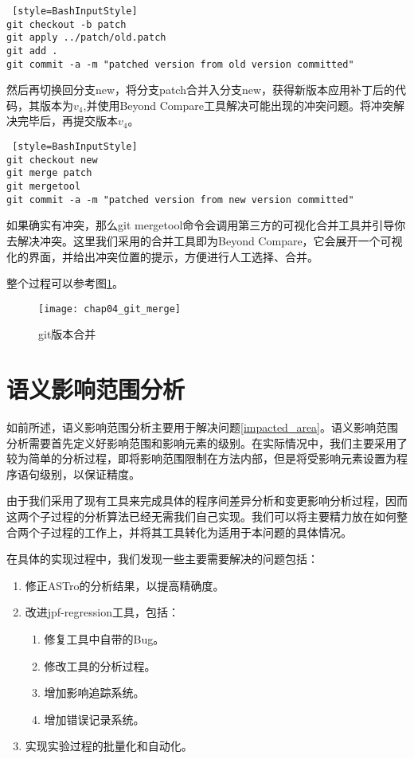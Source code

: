 \begin{lstlisting} [style=BashInputStyle]
git checkout -b patch
git apply ../patch/old.patch
git add .
git commit -a -m "patched version from old version committed"
\end{lstlisting}

然后再切换回分支new，将分支patch合并入分支new，获得新版本应用补丁后的代码，其版本为$v_4$,并使用Beyond Compare工具解决可能出现的冲突问题。将冲突解决完毕后，再提交版本$v_4$。

\begin{lstlisting} [style=BashInputStyle]
git checkout new
git merge patch
git mergetool
git commit -a -m "patched version from new version committed"
\end{lstlisting}

如果确实有冲突，那么git mergetool命令会调用第三方的可视化合并工具并引导你去解决冲突。这里我们采用的合并工具即为Beyond Compare，它会展开一个可视化的界面，并给出冲突位置的提示，方便进行人工选择、合并。

整个过程可以参考图\ref {git_merge}。

\begin{figure}[H]
	\centering
	\texttt{[image: chap04\_git\_merge]}
	\caption {git版本合并}
	\label {git_merge}	
\end{figure}

\section{语义影响范围分析}

如前所述，语义影响范围分析主要用于解决问题\ref {impacted_area}。语义影响范围分析需要首先定义好影响范围和影响元素的级别。在实际情况中，我们主要采用了较为简单的分析过程，即将影响范围限制在方法内部，但是将受影响元素设置为程序语句级别，以保证精度。

由于我们采用了现有工具来完成具体的程序间差异分析和变更影响分析过程，因而这两个子过程的分析算法已经无需我们自己实现。我们可以将主要精力放在如何整合两个子过程的工作上，并将其工具转化为适用于本问题的具体情况。

在具体的实现过程中，我们发现一些主要需要解决的问题包括：
\begin{enumerate}
	\item 修正ASTro的分析结果，以提高精确度。
	\item 改进jpf-regression工具，包括：
		\begin{enumerate}
			\item 修复工具中自带的Bug。
			\item 修改工具的分析过程。
			\item 增加影响追踪系统。
			\item 增加错误记录系统。
		\end{enumerate}
	
	\item 实现实验过程的批量化和自动化。
\end{enumerate}

